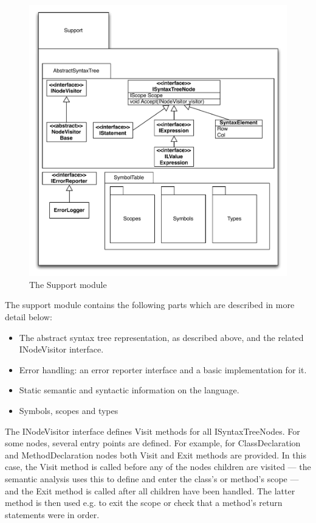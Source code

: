 \documentclass[a4paper,11pt]{article}
\begin{document}
\begin{figure}[h!]
\centering
\includegraphics[width=1.0\textwidth]{support.pdf}
\caption{The Support module}
\end{figure}

The support module contains the following parts which are described in more detail below:
\begin{itemize}
\item The abstract syntax tree representation, as described above, and the related INodeVisitor interface.
\item Error handling: an error reporter interface and a basic implementation for it.
\item Static semantic and syntactic information on the language.
\item Symbols, scopes and types
\end{itemize}

The INodeVisitor interface defines Visit methods for all ISyntaxTreeNodes. For some nodes, several entry points are defined. For example, for ClassDeclaration and MethodDeclaration nodes both Visit and Exit methods are provided. In this case, the Visit method is called before any of the nodes children are visited --- the semantic analysis uses this to define and enter the class's or method's scope --- and the Exit method is called after all children have been handled. The latter method is then used e.g. to exit the scope or check that a method's return statements were in order.
\end{document}
